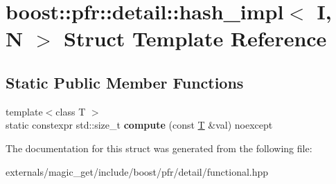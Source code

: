 \hypertarget{structboost_1_1pfr_1_1detail_1_1hash__impl}{}\section{boost\+:\+:pfr\+:\+:detail\+:\+:hash\+\_\+impl$<$ I, N $>$ Struct Template Reference}
\label{structboost_1_1pfr_1_1detail_1_1hash__impl}
\subsection*{Static Public Member Functions}
\begin{DoxyCompactItemize}
\item 
\mbox{\label{structboost_1_1pfr_1_1detail_1_1hash__impl_a983979565258d15af8f7dc4e83abcd77}} 
{\footnotesize template$<$class T $>$ }\\static constexpr std\+::size\+\_\+t {\bfseries compute} (const \mbox{\hyperlink{struct_t}{T}} \&val) noexcept
\end{DoxyCompactItemize}


The documentation for this struct was generated from the following file\+:\begin{DoxyCompactItemize}
\item 
externals/magic\+\_\+get/include/boost/pfr/detail/functional.\+hpp\end{DoxyCompactItemize}
